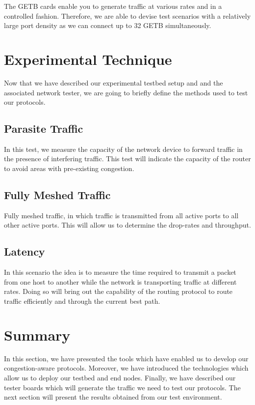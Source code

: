 The GETB cards enable you to generate traffic at various rates and in a
controlled fashion. Therefore, we are able to devise test scenarios with a relatively
large port density as we can connect up to 32 GETB simultaneously.


\section{Experimental Technique}

Now that we have described our experimental testbed setup and and the
associated network tester, we are going to briefly define the methods used to
test our protocols. 

\subsection{Parasite Traffic}

In this test, we measure the capacity of the network device to forward traffic
in the presence of interfering traffic. This test will indicate the capacity of
the router to avoid areas with pre-existing congestion.

\subsection{Fully Meshed Traffic}

Fully meshed traffic, in which traffic is transmitted from all active
ports to all other active ports. This will allow us to determine the
drop-rates and throughput.

\subsection{Latency}

In this scenario the idea is to measure the time required to transmit a packet
from one host to another while the network is transporting traffic at different
rates. Doing so will bring out the capability of the routing protocol to route
traffic efficiently and through the current best path.

\section{Summary}

In this section, we have presented the tools which have enabled us to develop our congestion-aware protocols. Moreover, we have introduced the technologies which allow us to deploy our testbed and end nodes. Finally, we have described our tester boards which will generate the traffic we need to test our protocols. The next section will present the results obtained from our test environment.
